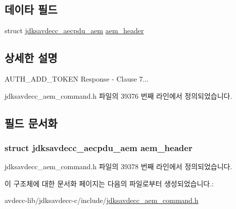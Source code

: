 \subsection*{데이타 필드}
\begin{DoxyCompactItemize}
\item 
struct \hyperlink{structjdksavdecc__aecpdu__aem}{jdksavdecc\+\_\+aecpdu\+\_\+aem} \hyperlink{structjdksavdecc__aem__command__auth__add__token__response_ae1e77ccb75ff5021ad923221eab38294}{aem\+\_\+header}
\end{DoxyCompactItemize}


\subsection{상세한 설명}
A\+U\+T\+H\+\_\+\+A\+D\+D\+\_\+\+T\+O\+K\+EN Response -\/ Clause 7... 

jdksavdecc\+\_\+aem\+\_\+command.\+h 파일의 39376 번째 라인에서 정의되었습니다.



\subsection{필드 문서화}
\subsubsection[{\texorpdfstring{aem\+\_\+header}{aem_header}}]{\setlength{\rightskip}{0pt plus 5cm}struct {\bf jdksavdecc\+\_\+aecpdu\+\_\+aem} aem\+\_\+header}\hypertarget{structjdksavdecc__aem__command__auth__add__token__response_ae1e77ccb75ff5021ad923221eab38294}{}\label{structjdksavdecc__aem__command__auth__add__token__response_ae1e77ccb75ff5021ad923221eab38294}


jdksavdecc\+\_\+aem\+\_\+command.\+h 파일의 39378 번째 라인에서 정의되었습니다.



이 구조체에 대한 문서화 페이지는 다음의 파일로부터 생성되었습니다.\+:\begin{DoxyCompactItemize}
\item 
avdecc-\/lib/jdksavdecc-\/c/include/\hyperlink{jdksavdecc__aem__command_8h}{jdksavdecc\+\_\+aem\+\_\+command.\+h}\end{DoxyCompactItemize}
